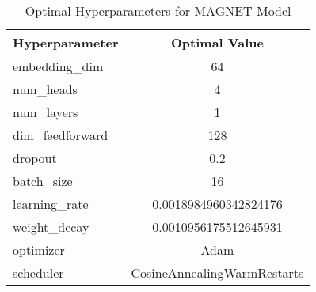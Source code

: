 \begin{table}[h]
\centering
\caption{Optimal Hyperparameters for MAGNET Model}
\label{tab:best_params}
\begin{tabular}{lc}
\toprule
Hyperparameter & Optimal Value \\
\midrule
embedding\_dim & 64 \\
num\_heads & 4 \\
num\_layers & 1 \\
dim\_feedforward & 128 \\
dropout & 0.2 \\
batch\_size & 16 \\
learning\_rate & 0.0018984960342824176 \\
weight\_decay & 0.0010956175512645931 \\
optimizer & Adam \\
scheduler & CosineAnnealingWarmRestarts \\
\bottomrule
\end{tabular}
\end{table}
